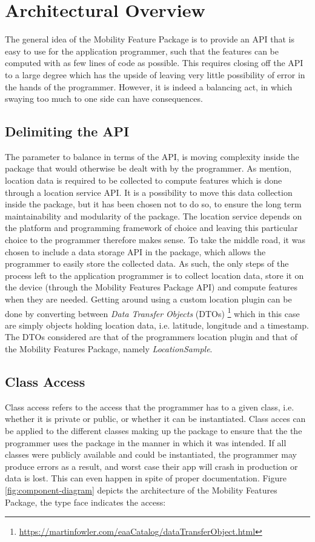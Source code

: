 \section{Architectural Overview}
The general idea of the Mobility Feature Package is to provide an API that is easy to use for the application programmer, such that the features can be computed with as few lines of code as possible. This requires closing off the API to a large degree which has the upside of leaving very little possibility of error in the hands of the programmer. However, it is indeed a balancing act, in which swaying too much to one side can have consequences. 

\subsection{Delimiting the API}
The parameter to balance in terms of the API, is moving complexity inside the package that would otherwise be dealt with by the programmer. As mention, location data is required to be collected to compute features which is done through a location service API. It is a possibility to move this data collection inside the package, but it has been chosen not to do so, to ensure the long term maintainability and modularity of the package. The location service depends on the platform and programming framework of choice and leaving this particular choice to the programmer therefore makes sense. To take the middle road, it was chosen to include a data storage API in the package, which allows the programmer to easily store the collected data. As such, the only steps of the process left to the application programmer is to collect location data, store it on the device (through the Mobility Features Package API) and compute features when they are needed. Getting around using a custom location plugin can be done by converting between \textit{Data Transfer Objects} (DTOs) \footnote{\url{https://martinfowler.com/eaaCatalog/dataTransferObject.html}} which in this case are simply objects holding location data, i.e. latitude, longitude and a timestamp. The DTOs considered are that of the programmers location plugin and that of the Mobility Features Package, namely \textit{LocationSample}.

\subsection{Class Access}
 Class access refers to the access that the programmer has to a given class, i.e. whether it is private or public, or whether it can be instantiated. Class acces can be applied to the different classes making up the package to ensure that the the programmer uses the package in the manner in which it was intended. If all classes were publicly available and could be instantiated, the programmer may produce errors as a result, and worst case their app will crash in production or data is lost. This can even happen in spite of proper documentation. Figure \ref{fig:component-diagram} depicts the architecture of the Mobility Features Package, the type face indicates the access: 
 
